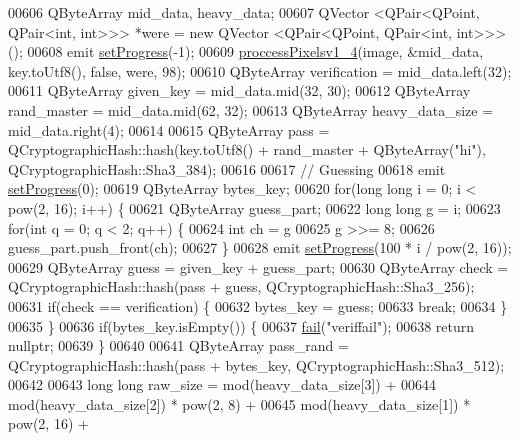 \begin{DoxyCode}
00606     QByteArray mid\_data, heavy\_data;
00607     QVector <QPair<QPoint, QPair<int, int>>> *were = \textcolor{keyword}{new} QVector <QPair<QPoint, QPair<int, int>>>();
00608     emit \hyperlink{class_model_p_c_afdcd80f0ed5062e145a71f09b0897547}{setProgress}(-1);
00609     \hyperlink{class_model_p_c_a5cdb4d1d61ff62ee9d45b496a7dbf1fb}{proccessPixelsv1\_4}(image, &mid\_data, key.toUtf8(), \textcolor{keyword}{false}, were, 98);
00610     QByteArray verification = mid\_data.left(32);
00611     QByteArray given\_key = mid\_data.mid(32, 30);
00612     QByteArray rand\_master = mid\_data.mid(62, 32);
00613     QByteArray heavy\_data\_size = mid\_data.right(4);
00614 
00615     QByteArray pass = QCryptographicHash::hash(key.toUtf8() + rand\_master + QByteArray(\textcolor{stringliteral}{"hi"}), 
      QCryptographicHash::Sha3\_384);
00616 
00617     \textcolor{comment}{// Guessing}
00618     emit \hyperlink{class_model_p_c_afdcd80f0ed5062e145a71f09b0897547}{setProgress}(0);
00619     QByteArray bytes\_key;
00620     \textcolor{keywordflow}{for}(\textcolor{keywordtype}{long} \textcolor{keywordtype}{long} i = 0; i < pow(2, 16); i++) \{
00621         QByteArray guess\_part;
00622         \textcolor{keywordtype}{long} \textcolor{keywordtype}{long} g = i;
00623         \textcolor{keywordflow}{for}(\textcolor{keywordtype}{int} q = 0; q < 2; q++) \{
00624                 \textcolor{keywordtype}{int} ch = g %
00625                 g >>= 8;
00626                 guess\_part.push\_front(ch);
00627             \}
00628         emit \hyperlink{class_model_p_c_afdcd80f0ed5062e145a71f09b0897547}{setProgress}(100 * i / pow(2, 16));
00629         QByteArray guess = given\_key + guess\_part;
00630         QByteArray check = QCryptographicHash::hash(pass + guess, QCryptographicHash::Sha3\_256);
00631         \textcolor{keywordflow}{if}(check == verification) \{
00632             bytes\_key = guess;
00633             \textcolor{keywordflow}{break};
00634         \}
00635     \}
00636     \textcolor{keywordflow}{if}(bytes\_key.isEmpty()) \{
00637         \hyperlink{class_model_p_c_a47464b59b7e37fcee25e55475708aabd}{fail}(\textcolor{stringliteral}{"veriffail"});
00638         \textcolor{keywordflow}{return} \textcolor{keyword}{nullptr};
00639     \}
00640 
00641     QByteArray pass\_rand = QCryptographicHash::hash(pass + bytes\_key, QCryptographicHash::Sha3\_512);
00642 
00643     \textcolor{keywordtype}{long} \textcolor{keywordtype}{long} raw\_size = mod(heavy\_data\_size[3]) +
00644             mod(heavy\_data\_size[2]) * pow(2, 8) +
00645             mod(heavy\_data\_size[1]) * pow(2, 16) +

\end{DoxyCode}
